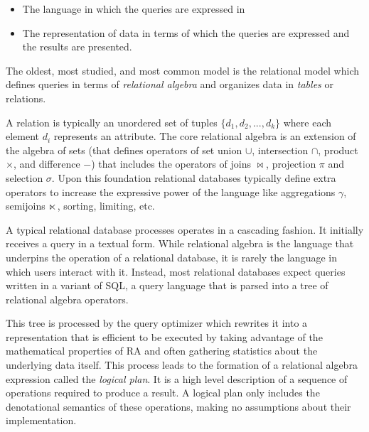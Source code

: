 \begin{itemize}
\item The language in which the queries are expressed in
\item The representation of data in terms of which the queries are
  expressed and the results are presented.
\end{itemize}

The oldest, most studied, and most common model is the relational model
which defines queries in terms of \emph{relational algebra} and organizes
data in \emph{tables} or relations.

A relation is typically an unordered set of tuples
\(\{d_1,d_2,...,d_k\}\) where each element \(d_i\) represents an
attribute. The core relational algebra is an extension of the algebra
of sets (that defines operators of set union \(\cup\), intersection
\(\cap\), product \(\times\), and difference \(-\)) that includes the
operators of joins \(\Join\), projection \(\pi\) and selection
\(\sigma\). Upon this foundation relational databases typically define
extra operators to increase the expressive power of the language like
aggregations \(\gamma\), semijoins \(\ltimes\), sorting, limiting, etc.

A typical relational database processes operates in a cascading
fashion. It initially receives a query in a textual form. While
relational algebra is the language that underpins the operation of a
relational database, it is rarely the language in which users interact
with it. Instead, most relational databases expect queries written in a
variant of SQL, a query language that is parsed into a tree of
relational algebra operators.

This tree is processed by the query optimizer which rewrites it into a
representation that is efficient to be executed by taking advantage
of the mathematical properties of RA and often gathering statistics
about the underlying data itself. This process leads to the formation
of a relational algebra expression called the \emph{logical plan}. It
is a high level description of a sequence of operations required to
produce a result. A logical plan only includes the denotational
semantics of these operations, making no assumptions about their
implementation.

